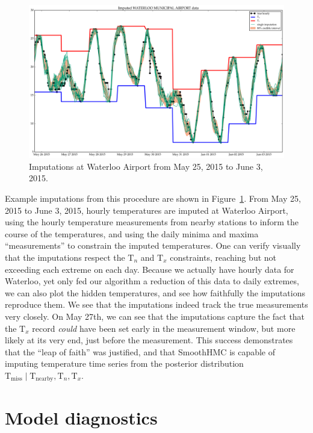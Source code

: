 \documentclass[letter]{article}
\makeatletter
\def\maxwidth{\ifdim\Gin@nat@width>\linewidth\linewidth
\else\Gin@nat@width\fi}
\let\Oldincludegraphics\includegraphics
\renewcommand{\includegraphics}[1]{\Oldincludegraphics[width=.8\maxwidth]{#1}}
\newcommand{\T}{\mathrm{T}}
\newcommand{\Tn}{\T_{n}}
\newcommand{\Tx}{\T_{x}}
\newcommand{\miss}{\mathrm{miss}}
\newcommand{\obs}{\mathrm{nearby}}
\makeatother
\begin{document}
        \begin{figure}
\centering
\includegraphics{../figures/imputations_SEonly.png}
\caption{\label{fig:imputations_SEonly}Imputations at Waterloo Airport from May 25, 2015 to June 3, 2015.}
\end{figure}
    


        Example imputations from this procedure are shown in Figure~\ref{fig:imputations_SEonly}.
From May 25, 2015 to June 3, 2015, hourly temperatures are imputed at Waterloo Airport, using the hourly temperature measurements from nearby stations to inform the course of the temperatures, and using the daily minima and maxima ``measurements'' to constrain the imputed temperatures.
One can verify visually that the imputations respect the \(\Tn\) and \(\Tx\) constraints, reaching but not exceeding each extreme on each day.
Because we actually have hourly data for Waterloo, yet only fed our algorithm a reduction of this data to daily extremes, we can also plot the hidden temperatures, and see how faithfully the imputations reproduce them.
We see that the imputations indeed track the true measurements very closely.
On May 27th, we can see that the imputations capture the fact that the \(\Tx\) record \emph{could} have been set early in the measurement window, but more likely at its very end, just before the measurement.
This success demonstrates that the ``leap of faith'' was justified, and that SmoothHMC is capable of imputing temperature time series from the posterior distribution \(\T_\miss \mid \T_\obs, \Tn, \Tx\).
    


        \section{Model diagnostics}\label{model-diagnostics}
\end{document}
